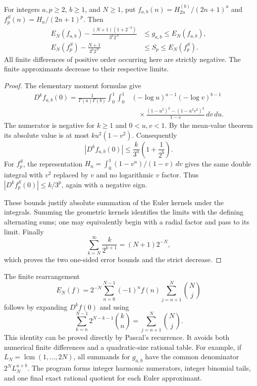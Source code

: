\begin{proposition}
\label{cont26:prop:direct-euler}
For integers $a,p\geq2$, $b\geq1$, and $N\geq1$, put
$f_{a,b}(n)=H_{2n}^{(b)}/(2n+1)^a$ and
$f_p^S(n)=H_n/(2n+1)^p$. Then
\begin{align}
 E_N(f_{a,b})-
 \frac{(N+1)(1+2^{-b})}{3^a2^N}
 &\leq g_{a,b}\leq E_N(f_{a,b}),
 \label{cont26:eq:direct-g-bound}\\
 E_N(f_p^S)-\frac{N+1}{3^p2^N}
 &\leq S_p\leq E_N(f_p^S).
 \label{cont26:eq:direct-s-bound}
\end{align}
All finite differences of positive order occurring here are strictly
negative. The finite approximants decrease to their respective limits.
\end{proposition}

\begin{proof}
The elementary moment formulas give
\begin{align*}
 D^kf_{a,b}(0)
 =\frac1{\Gamma(a)\Gamma(b)}
 \int_0^1\int_0^1
 &(-\log u)^{a-1}(-\log v)^{b-1}\\[-0.5em]
 &\quad\times
 \frac{(1-u^2)^k-(1-u^2v^2)^k}{1-v}\,dv\,du.
\end{align*}
The numerator is negative for $k\geq1$ and $0<u,v<1$. By the
mean-value theorem its absolute value is at most
$ku^2(1-v^2)$. Consequently
\[
 |D^kf_{a,b}(0)|
 \leq \frac{k}{3^a}\left(1+\frac1{2^b}\right).
\]
For $f_p^S$, the representation
$H_n=\int_0^1(1-v^n)/(1-v)\,dv$ gives the same double integral
with $v^2$ replaced by $v$ and no logarithmic $v$ factor. Thus
$|D^kf_p^S(0)|\leq k/3^p$, again with a negative sign.

These bounds justify absolute summation of the Euler kernels under
the integrals. Summing the geometric kernels identifies the limits with
the defining alternating sums; one may equivalently begin with a radial
factor and pass to its limit. Finally
\[
 \sum_{k=N}^{\infty}\frac{k}{2^{k+1}}=(N+1)2^{-N},
\]
which proves the two one-sided error bounds and the strict decrease.
\end{proof}

The finite rearrangement
\begin{equation}\label{cont26:eq:s8-euler-weights}
 E_N(f)=2^{-N}\sum_{n=0}^{N-1}(-1)^n f(n)
             \sum_{j=n+1}^N\binom Nj
\end{equation}
follows by expanding $D^kf(0)$ and using
\[
 \sum_{k=n}^{N-1}2^{N-k-1}\binom kn
 =\sum_{j=n+1}^N\binom Nj.
\]
This identity can be proved directly by Pascal's recurrence. It avoids
both numerical finite differences and a quadratic-size rational table.
For example, if $L_N=\operatorname{lcm}(1,\ldots,2N)$, all summands for
$g_{a,b}$ have the common denominator $2^NL_N^{a+b}$.
The program forms integer harmonic numerators, integer binomial tails,
and one final exact rational quotient for each Euler approximant.

